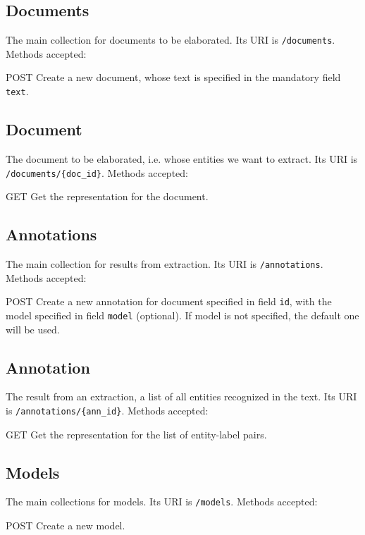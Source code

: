 \documentclass[a4paper,11pt]{report}
\begin{document}
\subsection*{Documents}
The main collection for documents to be elaborated. Its URI is \texttt{/documents}.
Methods accepted:

\begin{description}
\item{POST} Create a new document, whose text is specified in the mandatory field \texttt{text}.
\end{description}

\subsection*{Document}
The document to be elaborated, i.e. whose entities we want to extract. Its URI is \texttt{/documents/\{doc\_id\}}.
Methods accepted:

\begin{description}
\item{GET} Get the representation for the document.
\end{description}

\subsection*{Annotations}
The main collection for results from extraction. Its URI is \texttt{/annotations}.
Methods accepted:
\begin{description}
\item{POST} Create a new annotation for document specified in field \texttt{id}, with the model specified in field \texttt{model} (optional). If model is not specified, the default one will be used.
\end{description}

\subsection*{Annotation}
The result from an extraction, a list of all entities recognized in the text. Its URI is \texttt{/annotations/\{ann\_id\}}. Methods accepted:
\begin{description}
\item{GET} Get the representation for the list of entity-label pairs.
\end{description}

\subsection*{Models}
The main collections for models. Its URI is \texttt{/models}. Methods accepted:
\begin{description}
\item{POST} Create a new model.
\end{description}
\end{document}
